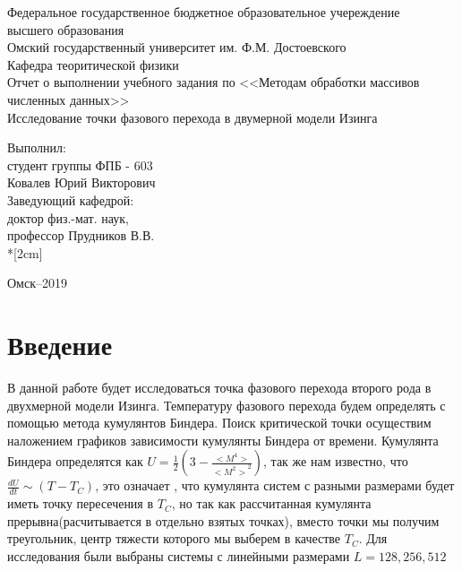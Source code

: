 \documentclass[12pt,a4paper]{article}
\begin{document}
	\begin{titlepage}
		\begin{center}
			Федеральное государственное бюджетное образовательное учереждение\\
			высшего образования\\[0.5cm]
			Омский государственный университет им. Ф.М. Достоевского\\[0.5cm]
			Кафедра теоритической физики\\[2cm]
			
			Отчет о выполнении учебного задания  по <<Методам обработки массивов численных данных>>\\
			
			{\large{Исследование точки фазового перехода в двумерной модели Изинга}}\\[2cm]
		\end{center}
		
		\begin{flushright}
			Выполнил:\\ студент группы ФПБ - 603\\
			Ковалев Юрий Викторович\\[2cm]
			Заведующий кафедрой:\\
			доктор физ.-мат. наук,\\
			профессор Прудников В.В.\\*[2cm]
		\end{flushright}
		
		\begin{center}
			Омск--2019
		\end{center}
	\end{titlepage}
	\newpage
	
	\setcounter{page}{2} \tableofcontents
	\newpage
	\graphicspath{{pic/}}
		\section*{Введение}
	В данной работе будет исследоваться точка фазового перехода второго рода в двухмерной модели Изинга. Температуру фазового перехода будем определять с помощью метода кумулянтов Биндера.
	Поиск критической точки осуществим наложением графиков зависимости кумулянты Биндера от времени.
	Кумулянта Биндера определятся как $U = \frac{1}{2}(3 - \frac{<M^4>}{{<M^2>}^2})$, так же нам известно, что $\frac{dU}{dt} \sim (T - T_C)$, это означает , что кумулянта систем с разными размерами будет иметь точку пересечения в $T_C$, но так как рассчитанная кумулянта прерывна(расчитывается в отдельно взятых точках), вместо точки мы получим треугольник, центр тяжести которого мы выберем в качестве $T_C$. Для исследования были выбраны системы с линейными размерами $L = 128, 256, 512$
	
\end{document}
